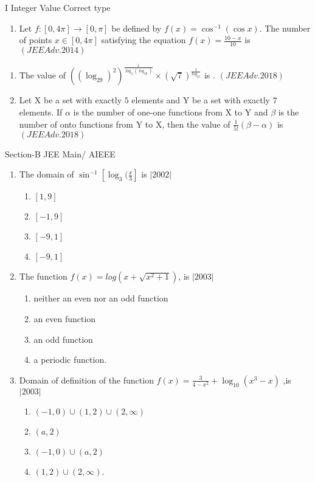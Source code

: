 \documentclass[journal,12pt,twocolumn]{IEEEtran}
\theoremstyle{remark}
\begin{document}
  \begin{multicols}{2}
	   \begin{large} I Integer Value Correct type \end{large}
		   \begin{enumerate}
			   \item Let $f:[0,4\pi]\to[0,\pi]$ be defined by $f(x)=\cos^{-1}(\cos x)$. The number of points $x\in[0,4\pi]$ satisfying the equation ${f(x)=\frac{10-x}{10}}$ is \hfill${(JEE Adv.2014)}$
		   \end{enumerate}
		   \columnbreak
		   \begin{enumerate}[start=2]
			   \item The  value  of  $((\log_29)^2)^{\frac{1}{\log_2(\log_29)}}\times (\sqrt7)^{\frac{1}{log_47}}$  is .
				   \hfill${(JEEAdv.2018)}$
			   \item Let X be a set with exactly $5$ elements and Y be a set with exactly $7$ elements. If $\alpha$ is the number of one-one functions from X to Y and $\beta$ is the number of onto functions from Y to X, then the value of $\frac{1}{5!}(\beta-\alpha)$ is ${(JEEAdv.2018)}$
		   \end{enumerate}
  \end{multicols}
  \newpage 
  \twocolumn
  \begin{large} Section-B JEE Main/ AIEEE \end{large}
	  \begin{enumerate}
		  \item The domain of $\sin^{-1}[\log_3(\frac{x}{3}]$ is 
			  \hfill$|2002|$
			  \begin{enumerate}
		  \item $[1,9]$    
		  \item $[-1,9]$    
		  \item $[-9,1]$     
		  \item $[-9,1]$
			  \end{enumerate}
		  \item The function $f(x)=log(x+\sqrt{x^2+1})$, is 
			  \hfill$|2003|$
			  \begin{enumerate}[label=(\alph*)]
		  \item neither an even nor an odd function
		  \item an even function
		  \item an odd function
		  \item a periodic function.
			  \end{enumerate}
		  \item Domain of definition of the function $f(x)=\frac{3}{4-x^2}+\log_{10}(x^3-x)$ ,is 
			  \hfill$|2003|$
			  \begin{enumerate}[label=(\alph*)]
		  \item $(-1,0)\cup(1,2)\cup(2,\infty)$     
		  \item $(a,2)$
		  \item $(-1,0)\cup(a,2)$                   
		  \item $(1,2)\cup(2,\infty)$.
			  \end{enumerate}
	  \end{enumerate}
\end{document}

